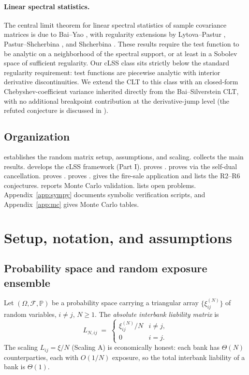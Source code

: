 \documentclass[11pt,a4paper]{article}
\theoremstyle{definition}
\begin{document}
\paragraph{Linear spectral statistics.} The central limit theorem for linear
spectral statistics of sample covariance matrices is due to Bai--Yao
\cite{BaiYao2005}, with regularity extensions by Lytova--Pastur
\cite{LytovaPastur2009}, Pastur--Shcherbina \cite{PasturShcherbina2011}, and
Shcherbina \cite{Shcherbina2011}. These results require the test function to
be analytic on a neighborhood of the spectral support, or at least in a
Sobolev space of sufficient regularity. Our cLSS class sits strictly below the
standard regularity requirement: test functions are piecewise analytic with
interior derivative discontinuities. We extend the CLT to this class with an
closed-form Chebyshev-coefficient variance inherited directly from the
Bai--Silverstein CLT, with no additional breakpoint contribution at the
derivative-jump level (the refuted conjecture is discussed in
).

\subsection{Organization}

 establishes the random matrix setup, assumptions, and scaling.
 collects the main results.  develops the cLSS
framework (Part I).  proves .
 proves  via the self-dual cancellation.
 proves .  proves
.  gives the fire-sale application and
lists the R2--R6 conjectures.  reports Monte Carlo
validation.  lists open problems. Appendix~\ref{app:sympy}
documents symbolic verification scripts, and Appendix~\ref{app:mc} gives
Monte Carlo tables.

\section{Setup, notation, and assumptions}
\label{sec:setup}

\subsection{Probability space and random exposure ensemble}

Let $(\Omega,\mathcal F,\mathbb P)$ be a probability space carrying a
triangular array $\{\xi_{ij}^{(N)}\}$ of random variables, $i\neq j$,
$N\geq 1$. The \emph{absolute interbank liability matrix} is
\[
L_{N,ij} \;=\; \begin{cases} \xi_{ij}^{(N)}/N & i\neq j,\\ 0 & i = j.\end{cases}
\]
The scaling $L_{ij} = \xi/N$ (Scaling A) is economically honest: each bank has
$\Theta(N)$ counterparties, each with $O(1/N)$ exposure, so the total
interbank liability of a bank is $\Theta(1)$.
\end{document}
